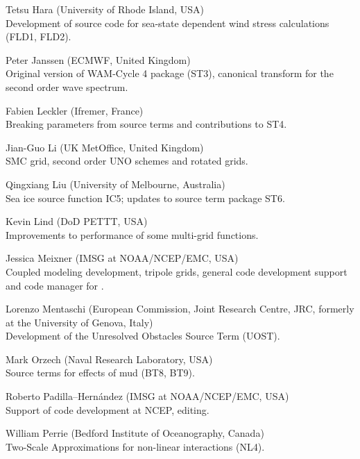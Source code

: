 \begin{list}{\ldots}{ }
\item [Tetsu Hara] (University of Rhode Island, USA) \\
  Development of source code for sea-state dependent wind stress calculations (FLD1, FLD2).

\item [Peter Janssen] (ECMWF, United Kingdom) \\
  Original version of WAM-Cycle 4 package (ST3), canonical transform for the second order wave spectrum.

\item [Fabien Leckler] (Ifremer, France) \\
  Breaking parameters from source terms and contributions to ST4.

\item [Jian-Guo Li] (UK MetOffice, United Kingdom) \\
  SMC grid, second order UNO schemes and rotated grids.

\item [Qingxiang Liu] (University of Melbourne, Australia)\\
Sea ice source function IC5; updates to source term package ST6.

\item [Kevin Lind]  (DoD PETTT, USA)\\ 
  Improvements to performance of some multi-grid functions.

\item [Jessica Meixner] (IMSG at NOAA/NCEP/EMC, USA) \\
  Coupled modeling development, tripole grids, general code development support  and code manager for \ws.
 
\item [Lorenzo Mentaschi]  (European Commission, Joint Research Centre, JRC,
  formerly at the University of Genova, Italy)\\ 
  Development of the Unresolved Obstacles Source Term (UOST).
 
\item [Mark Orzech]  (Naval Research Laboratory, USA)\\ 
  Source terms for effects of mud (BT8, BT9).

\item [Roberto Padilla--Hern\'andez]  (IMSG at NOAA/NCEP/EMC, USA)\\ 
  Support of code development at NCEP, editing.

\item [William Perrie] (Bedford Institute of Oceanography, Canada)\\
 Two-Scale Approximations for non-linear interactions (NL4).


\end{list}
